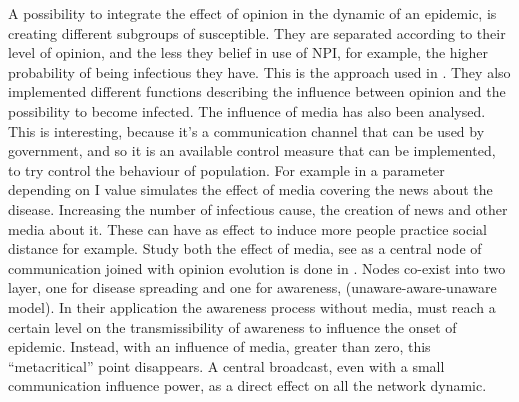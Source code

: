 A possibility to integrate the effect of opinion in the dynamic of an epidemic, is creating different subgroups of susceptible. They are separated according to their level of opinion, and the less they belief in use of NPI, for example, the higher probability of being infectious they have. This is the approach used in \cite{Tyson_2020}. They also implemented different functions describing the influence between opinion and the possibility to become infected. 
The influence of media has also been analysed. This is interesting, because it’s a communication channel that can be used by government, and so it is an available control measure that can be implemented, to try control the behaviour of population.  For example in \cite{Collinson2014} a parameter depending on I value simulates the effect of media covering the news about the disease. Increasing the number of infectious cause, the creation of news and other media about it. These can have as effect to induce more people practice social distance for example. Study both the effect of media, see as a central node of communication joined with opinion evolution is done in \cite{Granell_2014}. Nodes co-exist into two layer, one for disease spreading and one for awareness, (unaware-aware-unaware model). In their application the awareness process without media, must reach a certain level on the transmissibility of awareness to influence the onset of epidemic. Instead, with an influence of media, greater than zero, this “metacritical” point disappears. A central broadcast, even with a small communication influence power, as a direct effect on all the network dynamic. 

